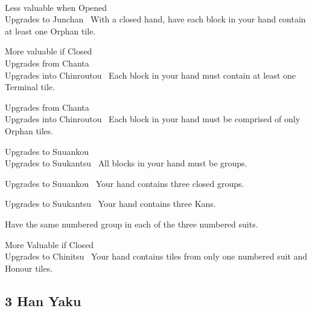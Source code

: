	{\closedhand \\ 
	\lessvaluable Less valuable when Opened~ \\
	\upgradesto Upgrades to Junchan~}
	{With a closed hand, have each block in your hand contain at least one Orphan tile.}

	{\morevaluable More valuable if Closed~ \\ 
	\upgradesfrom Upgrades from Chanta~ \\
	\upgradesto Upgrades into Chinroutou~}
	{Each block in your hand must contain at least one Terminal tile.}

	{\upgradesfrom Upgrades from Chanta~ \\
	\upgradesto Upgrades into Chinroutou~}
	{Each block in your hand must be comprised of only Orphan tiles.}

	{\upgradesto Upgrades to Suuankou~\\
	\upgradesto Upgrades to Suukantsu~}
	{All blocks in your hand must be groups.}

	{\upgradesto Upgrades to Suuankou~}
	{Your hand contains three closed groups.}

	{\upgradesto Upgrades to Suukantsu~}
	{Your hand contains three Kans.}

	{}
	{Have the same numbered group in each of the three numbered suits.}

	{\morevaluable More Valuable if Closed~\\
	\upgradesto Upgrades to Chinitsu~}
	{Your hand contains tiles from only one numbered suit and Honour tiles.}


\subsection{3 Han Yaku}\label{core:ssec:3-han-yaku}

